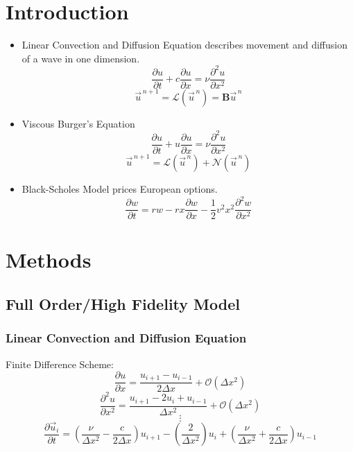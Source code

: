 \documentclass{a0poster}
\begin{document}
\begin{multicols}{3}

\color{Black} %
\section{Introduction}
\LARGE
\begin{itemize}
  \item Linear Convection and Diffusion Equation describes movement and diffusion of a wave in one dimension.
  $$\frac{\partial u}{\partial t} + c \frac{\partial u}{\partial x} = \nu \frac{\partial^2 u}{\partial x^2}$$
  $$\vec{u}^{\,n+1} = \mathcal{L}(\vec{u}^{\,n}) = \mathrm{\textbf{B}} \vec{u}^{\,n}$$
    
  \item Viscous Burger's Equation
  $$\frac{\partial u}{\partial t} + u \frac{\partial u}{\partial x} = \nu \frac{\partial^2 u}{\partial x^2}$$
  $$\vec{u}^{\,n+1} = \mathcal{L}(\vec{u}^{\,n}) + \mathcal{N}(\vec{u}^{\,n})$$
  
  \item Black-Scholes Model prices European options.
  $$\frac{\partial w}{\partial t} = rw - rx \frac{\partial w}{\partial x} - \frac{1}{2} v^2 x^2 \frac{\partial^2 w}{\partial x^2}$$
\end{itemize}


\section{Methods}
\LARGE
\subsection{Full Order/High Fidelity Model}

\subsubsection{Linear Convection and Diffusion Equation}

Finite Difference Scheme:
$$\frac{\partial u}{\partial x} = \frac{u_{i+1} - u_{i-1}}{2 \Delta x} + \mathcal{O}(\Delta x^2)$$
$$\frac{\partial^2 u}{\partial x^2} = \frac{u_{i+1} - 2u_i + u_{i-1}}{\Delta x^2} + \mathcal{O}(\Delta x^2)$$
$$\vdots$$
\Large
$$\frac{\partial \vec{u}_i}{\partial t} = \left(\frac{\nu}{\Delta x^2} - \frac{c}{2 \Delta x}\right)u_{i+1} - \left(\frac{2}{\Delta x^2}\right) u_i + \left( \frac{\nu}{\Delta x^2} + \frac{c}{2 \Delta x} \right) u_{i-1}$$


\end{multicols}
\end{document}
